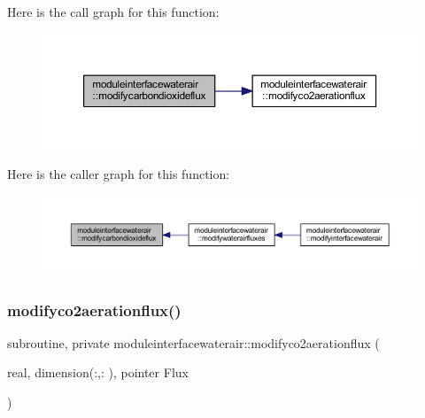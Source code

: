 Here is the call graph for this function\+:\nopagebreak
\begin{figure}[H]
\begin{center}
\leavevmode
\includegraphics[width=350pt]{namespacemoduleinterfacewaterair_a562697e89f9cb3b375137d30b5b565eb_cgraph}
\end{center}
\end{figure}
Here is the caller graph for this function\+:\nopagebreak
\begin{figure}[H]
\begin{center}
\leavevmode
\includegraphics[width=350pt]{namespacemoduleinterfacewaterair_a562697e89f9cb3b375137d30b5b565eb_icgraph}
\end{center}
\end{figure}
\mbox{\label{namespacemoduleinterfacewaterair_ad16fde1df2013d74710f42901a89754e}} 
\subsubsection{\texorpdfstring{modifyco2aerationflux()}{modifyco2aerationflux()}}
{\footnotesize\ttfamily subroutine, private moduleinterfacewaterair\+::modifyco2aerationflux (\begin{DoxyParamCaption}\item[{real, dimension(\+:,\+:  ), pointer}]{Flux }\end{DoxyParamCaption})\hspace{0.3cm}{\ttfamily [private]}}

